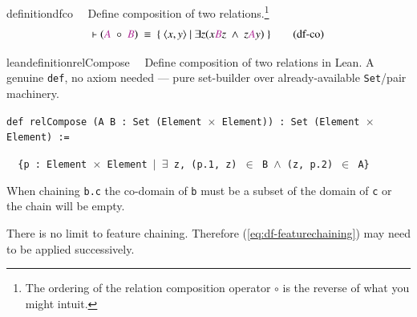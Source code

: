 \begin{restatable}{definition}{dfco}~~   Define composition of two relations.\footnote{The ordering of the relation composition operator $\circ$ is the reverse of what you might intuit.}
\begin{align}
\vdash (\mc{A}~\circ~\mc{B})~\equiv~\{~\langle x,y\rangle~\vert~\exists z ( x \mc{B} z~\wedge~z \mc{A} y )~\}
\label{eq:df-co}\tag{df-co}
\end{align}
\end{restatable}

\begin{restatable}{leandefinition}{relCompose}~~ Define composition of two relations in
Lean. A genuine \texttt{def}, no axiom needed --- pure set-builder over already-available \texttt{Set}/pair
machinery.

\texttt{\textcolor{leancolor}{def} \textcolor{leanyellow}{relCompose} (A B : Set (Element $\times$ Element)) : Set (Element $\times$ Element) :=}

\texttt{~~\{p : Element $\times$ Element $\vert$ $\exists$ z, (p.1, z) $\in$ B $\wedge$ (z, p.2) $\in$ A\}}
\label{relCompose}
\end{restatable}

\pn When chaining \texttt{b.c} the co-domain of \texttt{b} must be a subset of the domain of \texttt{c} or the chain will be empty.

\pn There is no limit to feature chaining.  Therefore (\ref{eq:df-featurechaining}) may need to be applied successively.

%
%
%




